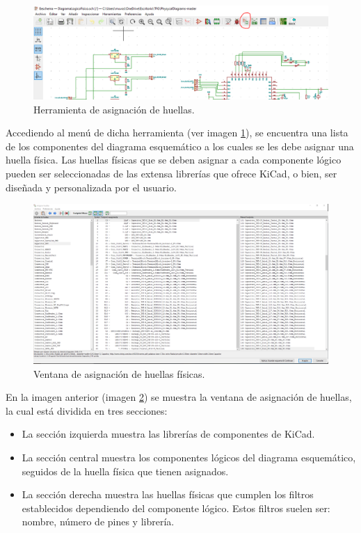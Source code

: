 \begin{figure}[H]
\centering 
\includegraphics[width=\linewidth]{pictures/HerramientaHuellas.PNG}
\caption{Herramienta de asignación de huellas.}
\label{fig:Herramienta_Huellas}
\end{figure}

Accediendo al menú de dicha herramienta (ver imagen \ref{fig:Herramienta_Huellas}), se encuentra una lista de los componentes del diagrama esquemático a los cuales se les debe asignar una huella física. Las huellas físicas que se deben asignar a cada componente lógico pueden ser seleccionadas de las extensa librerías que ofrece KiCad, o bien, ser diseñada y personalizada por el usuario.

\begin{figure}[H]
\centering 
\includegraphics[width=\linewidth]{pictures/AsignarHuellaTriple.PNG}
\caption{Ventana de asignación de huellas físicas.}
\label{fig:Asignar_Huella_Ventana}
\end{figure}

En la imagen anterior (imagen \ref{fig:Asignar_Huella_Ventana}) se muestra la ventana de asignación de huellas, la cual está dividida en tres secciones:
\begin{itemize}
    \item La sección izquierda muestra las librerías de componentes de KiCad.
    \item La sección central muestra los componentes lógicos del diagrama esquemático, seguidos de la huella física que tienen asignados.
    \item La sección derecha muestra las huellas físicas que cumplen los filtros establecidos dependiendo del componente lógico. Estos filtros suelen ser: nombre, número de pines y librería. 
\end{itemize}

